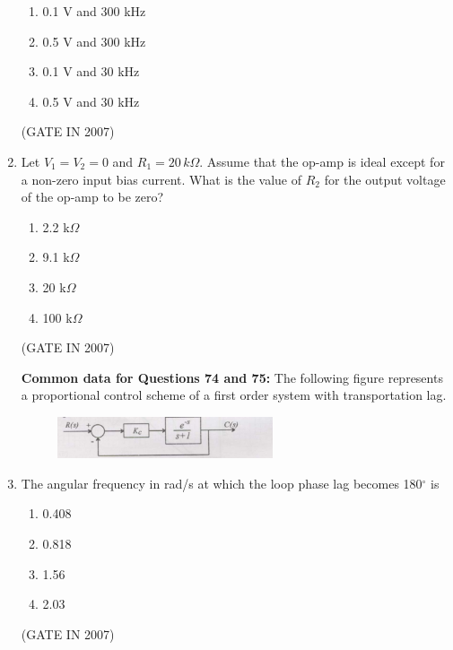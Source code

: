 \documentclass[journal]{IEEEtran}
\begin{document}
\begin{enumerate}
  \begin{multicols}{2}
\begin{enumerate}
    \item 0.1 V and 300 kHz
    \item0.5 V and 300 kHz
    \item 0.1 V and 30 kHz
    \item 0.5 V and 30 kHz
  \end{enumerate}
  \end{multicols}
\hfill(GATE IN 2007)

  \item Let $ V_1 = V_2 = 0 $ and $ R_1 = 20\,k\Omega $. Assume that the op-amp is ideal except for a non-zero input bias current. What is the value of $ R_2 $ for the output voltage of the op-amp to be zero?

  \begin{multicols}{4}
	  \begin{enumerate}
    \item 2.2 k$\Omega$
    \item 9.1 k$\Omega$
    \item 20 k$\Omega$
    \item 100 k$\Omega$
  \end{enumerate}
  \end{multicols}
\hfill(GATE IN 2007)

\textbf{Common data for Questions 74 and 75:}  
The following figure represents a proportional control scheme of a first order system with transportation lag.  
\begin{figure}[H]
    \centering
      \includegraphics[width=0.6\textwidth]{61.jpg} 
      \caption{}
    \label{fig:fig61} 
\end{figure}
\item 
The angular frequency in rad/s at which the loop phase lag becomes 180$^\circ$ is  

\begin{multicols}{4}
\begin{enumerate}
\item 0.408  
\item 0.818  
\item 1.56  
\item 2.03  
\end{enumerate}
\end{multicols}
\hfill(GATE IN 2007)


\end{enumerate}
\end{document}
